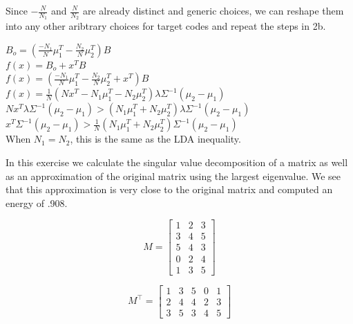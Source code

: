 \documentclass[12pt]{report}
\begin{document}

Since $-\frac{N}{N_1}$ and $\frac{N}{N_2}$ are already distinct and generic choices, we can reshape them into any other aribtrary choices for target codes and repeat the steps in 2b.

\hspace{3mm}


$B_o = (\frac{-N_1}{N}\mu_1^T-\frac{N_2}{N}\mu_2^T)B$\\

$f(x)=B_o + x^TB$\\

$f(x)=(\frac{-N_1}{N}\mu_1^T-\frac{N_2}{N}\mu_2^T +x^T)B$\\

$f(x)=\frac{1}{N}(Nx^T-N_1\mu_1^T-N_2\mu_2^T)\lambda\Sigma^{-1}(\mu_2-\mu_1)$\\

$Nx^T\lambda\Sigma^{-1}(\mu_2-\mu_1) > (N_1\mu_1^T+N_2\mu_2^T)\lambda\Sigma^{-1}(\mu_2-\mu_1)$\\

$x^T\Sigma^{-1}(\mu_2-\mu_1) > \frac{1}{N}(N_1\mu_1^T+N_2\mu_2^T)\Sigma^{-1}(\mu_2-\mu_1)$\\

When $N_1 = N_2$, this is the same as the LDA inequality.

\hspace{3mm}


In this exercise we calculate the singular value decomposition of a matrix as well as an approximation of the original matrix using the largest eigenvalue. We see that this approximation is very close to the original matrix and computed an energy of .908.

\[
M =
\begin{bmatrix}
1 & 2 & 3 \\
3 & 4 & 5 \\
5 & 4 & 3 \\
0 & 2 & 4 \\
1 & 3 & 5
\end{bmatrix}
\]


\[
M^\intercal =
\begin{bmatrix}
1 & 3 & 5 & 0 & 1 \\
2 & 4 & 4 & 2 & 3 \\
3 & 5 & 3 & 4 & 5
\end{bmatrix}
\]
\end{document}

